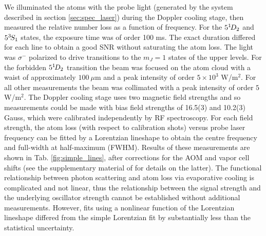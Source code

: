 

	

	We illuminated the atoms with the probe light (generated by the system described in section \ref{sec:spec_laser}) during the Doppler cooling stage, then measured the relative number loss as a function of frequency.
	For the $5^{1\!} D_2$ and $5^{3\!} S_1$ states, the exposure time was of order 100 ms. 
	The exact duration differed for each line to obtain a good SNR without saturating the atom loss.
	The light was $\sigma^-$ polarized to drive transitions to the $m_J=1$ states of the upper levels.
	For the forbidden $5^{1\!} D_2$ transition the beam was focused on the atom cloud with a waist of approximately $100~\mu$m and a peak intensity of order $5\times 10^3$ W/m$^2$.
	For all other measurements the beam was collimated with a peak intensity of order $ 5$ W/m$^2$.
	The Doppler cooling stage uses two magnetic field strengths and so measurements could be made with bias field strengths of {16.5(3)} and {10.2(3)} Gauss, which were calibrated independently by RF spectroscopy.
	For each field strength, the atom loss (with respect to calibration shots) versus probe laser frequency can be fitted by a Lorentzian lineshape to obtain the centre frequency and full-width at half-maximum (FWHM).
	Results of these measurements are shown in Tab.	\ref{fig:simple_lines}, after corrections for the AOM and vapor cell shifts (see the supplementary material of \cite{Thomas20} for details on the latter).
	{The functional relationship between photon scattering and atom loss via evaporative cooling is complicated and not linear, thus the relationship between the signal strength and the underlying oscillator strength cannot be established without additional measurements.
	However, fits using a nonlinear function of the Lorentzian lineshape differed from the simple Lorentzian fit by substantially less than the statistical uncertainty.}

